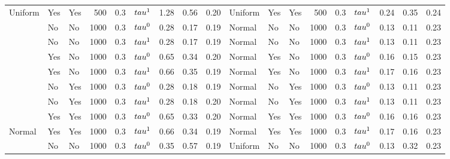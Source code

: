 \begin{tabular}[t]{lllrrlrrrlllrrlrrr}
\multirow{-8}{*}{\raggedright\arraybackslash Uniform} & Yes & Yes & 500 & 0.3 & $\\tau^1$ & 1.28 & 0.56 & 0.20 & Uniform & Yes & Yes & 500 & 0.3 & $\\tau^1$ & 0.24 & 0.35 & 0.24\\
\cmidrule{1-18}
 & No & No & 1000 & 0.3 & $\\tau^0$ & 0.28 & 0.17 & 0.19 & Normal & No & No & 1000 & 0.3 & $\\tau^0$ & 0.13 & 0.11 & 0.23\\

 & No & No & 1000 & 0.3 & $\\tau^1$ & 0.28 & 0.17 & 0.19 & Normal & No & No & 1000 & 0.3 & $\\tau^1$ & 0.13 & 0.11 & 0.23\\

 & Yes & No & 1000 & 0.3 & $\\tau^0$ & 0.65 & 0.34 & 0.20 & Normal & Yes & No & 1000 & 0.3 & $\\tau^0$ & 0.16 & 0.15 & 0.23\\

 & Yes & No & 1000 & 0.3 & $\\tau^1$ & 0.66 & 0.35 & 0.19 & Normal & Yes & No & 1000 & 0.3 & $\\tau^1$ & 0.17 & 0.16 & 0.23\\

 & No & Yes & 1000 & 0.3 & $\\tau^0$ & 0.28 & 0.18 & 0.19 & Normal & No & Yes & 1000 & 0.3 & $\\tau^0$ & 0.13 & 0.11 & 0.23\\

 & No & Yes & 1000 & 0.3 & $\\tau^1$ & 0.28 & 0.18 & 0.20 & Normal & No & Yes & 1000 & 0.3 & $\\tau^1$ & 0.13 & 0.11 & 0.23\\

 & Yes & Yes & 1000 & 0.3 & $\\tau^0$ & 0.65 & 0.33 & 0.20 & Normal & Yes & Yes & 1000 & 0.3 & $\\tau^0$ & 0.16 & 0.16 & 0.23\\

\multirow{-8}{*}{\raggedright\arraybackslash Normal} & Yes & Yes & 1000 & 0.3 & $\\tau^1$ & 0.66 & 0.34 & 0.19 & Normal & Yes & Yes & 1000 & 0.3 & $\\tau^1$ & 0.17 & 0.16 & 0.23\\
\cmidrule{1-18}
 & No & No & 1000 & 0.3 & $\\tau^0$ & 0.35 & 0.57 & 0.19 & Uniform & No & No & 1000 & 0.3 & $\\tau^0$ & 0.13 & 0.32 & 0.23\\


\end{tabular}
